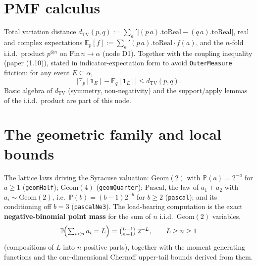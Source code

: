 \section{PMF calculus}

\begin{definition}\label{S1}
  \leanok
Total variation distance \(d_{\mathrm{TV}}(p,q) := \sum_a' |(p\,a).\mathrm{toReal} - (q\,a).\mathrm{toReal}|\),
real and complex expectations \(\mathbb{E}_p[f] := \sum_a' (p\,a).\mathrm{toReal}\cdot f(a)\),
and the \(n\)-fold i.i.d.\ product \(p^{\otimes n}\) on \(\mathrm{Fin}\,n\to\alpha\)
(node D1).  Together with the coupling inequality (paper (1.10)), stated in indicator-expectation
form to avoid \texttt{OuterMeasure} friction: for any event \(E\subseteq\alpha\),
\[
  \bigl|\mathbb{E}_p[\mathbf 1_E] - \mathbb{E}_q[\mathbf 1_E]\bigr| \le d_{\mathrm{TV}}(p,q).
\]
Basic algebra of \(d_{\mathrm{TV}}\) (symmetry, non-negativity) and the support/apply lemmas of
the i.i.d.\ product are part of this node.
\end{definition}

\section{The geometric family and local bounds}

\begin{definition}\label{S2}
  \leanok
The lattice laws driving the Syracuse valuation: \(\mathrm{Geom}(2)\) with
\(\mathbb{P}(a)=2^{-a}\) for \(a\ge 1\) (\texttt{geomHalf}); \(\mathrm{Geom}(4)\)
(\texttt{geomQuarter}); \(\mathrm{Pascal}\), the law of \(a_1+a_2\) with
\(a_i\sim\mathrm{Geom}(2)\), i.e.\ \(\mathbb{P}(b)=(b-1)2^{-b}\) for \(b\ge 2\)
(\texttt{pascal}); and its conditioning off \(b=3\) (\texttt{pascalNe3}).  The load-bearing
computation is the exact \textbf{negative-binomial point mass} for the sum of \(n\) i.i.d.\
\(\mathrm{Geom}(2)\) variables,
\[
  \mathbb{P}\!\Bigl(\textstyle\sum_{i<n} a_i = L\Bigr)
    = \binom{L-1}{n-1}\,2^{-L}, \qquad L\ge n\ge 1
\]
(compositions of \(L\) into \(n\) positive parts), together with the moment generating
functions and the one-dimensional Chernoff upper-tail bounds derived from them.
\lapsrisk{6--12}{low}{90\%}
\end{definition}

